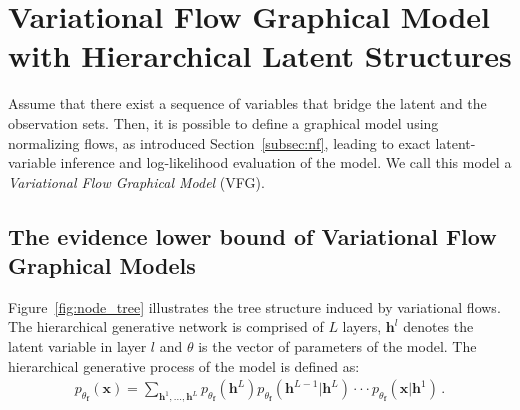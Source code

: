 \documentclass{article} %
\begin{document}
\section{Variational Flow Graphical Model with Hierarchical Latent Structures}\label{sec:main}

Assume that there exist a sequence of variables that bridge the latent and the observation sets.
Then, it is possible to define a graphical model using normalizing flows, as introduced Section~\ref{subsec:nf}, leading to exact latent-variable inference and log-likelihood evaluation of the model. 
We call this model a \textit{Variational Flow Graphical Model} (VFG).

\subsection{The evidence lower bound of Variational Flow Graphical Models}
Figure~\ref{fig:node_tree} illustrates the tree structure induced by variational flows.  
The hierarchical generative network is comprised of $L$ layers, $\mathbf{h}^l$ denotes the latent variable in layer $l$ and $\theta$ is the vector of parameters of the model. 
The hierarchical generative process of the model is defined as:
\begin{align*}
p_{\theta_{\mathbf{f}}}(\mathbf{x}) = \sum_{\mathbf{h}^1, ..., \mathbf{h}^L} p_{\theta_{\mathbf{f}}}(\mathbf{h}^L)p_{\theta_{\mathbf{f}}}(\mathbf{h}^{L-1} | \mathbf{h}^{L}) \cdot \cdot  \cdot  p_{\theta_{\mathbf{f}}}(\mathbf{x} | \mathbf{h}^{1}) \, .
\end{align*}
\end{document}
